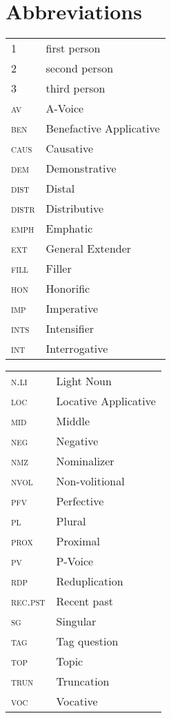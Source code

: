 \documentclass[output=paper,
\ChapterDOI{10.5281/zenodo.15697583}
colorlinks,
citecolor=brown]{langscibook}
\begin{document}
\section*{Abbreviations}
\begin{tabularx}{.5\textwidth}{@{}lQ@{}}
1           & first person \\
2           & second person \\
3           & third person \\
\textsc{av} & A-Voice \\
\textsc{ben} & Benefactive Applicative\\
\textsc{caus} & Causative \\
\textsc{dem} & Demonstrative \\
\textsc{dist} & Distal \\
\textsc{distr} & Distributive \\
\textsc{emph} & Emphatic \\
\textsc{ext} & General Extender\\
\textsc{fill} & Filler \\
\textsc{hon} & Honorific\\
\textsc{imp} & Imperative \\
\textsc{ints} & Intensifier \\
\textsc{int} & Interrogative \\
\end{tabularx}%
\begin{tabularx}{.5\textwidth}{@{}lQ@{}}
\textsc{n.li} & Light Noun\\
\textsc{loc} & Locative Applicative\\
\textsc{mid} & Middle \\
\textsc{neg} & Negative \\
\textsc{nmz} & Nominalizer \\
\textsc{nvol} & Non-volitional \\
\textsc{pfv} & Perfective \\
\textsc{pl} & Plural \\
\textsc{prox} & Proximal\\
\textsc{pv} & P-Voice \\
\textsc{rdp} & Reduplication \\
\textsc{rec.pst} & Recent past \\
\textsc{sg} & Singular \\ 
\textsc{tag} & Tag question \\
\textsc{top} & Topic \\ 
\textsc{trun} & Truncation \\
\textsc{voc} & Vocative\\
\end{tabularx}
\end{document}
